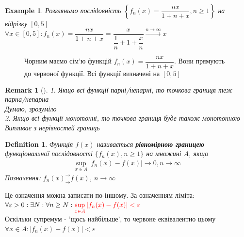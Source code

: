 \documentclass[a4paper, 14pt]{extarticle}
\def\huge{\displaystyle}
\theoremstyle{theoremdd}
\theoremstyle{theoremdd}
\newtheorem{definition}[theorem]{Definition}
\theoremstyle{theoremdd}
\theoremstyle{theoremdd}
\newtheorem{example}[theorem]{Example}
\theoremstyle{theoremdd}
\theoremstyle{theoremdd}
\newtheorem{remark}[theorem]{Remark}
\theoremstyle{theoremdd}
\theoremstyle{theoremdd}
\begin{document}
\begin{example}
Розгляньмо послідовність $\left\{f_n(x) = \dfrac{nx}{1+n+x}, n \geq 1 \right\}$ на відрізку $[0,5]$\\
$\forall x \in [0,5]: f_n(x) = \dfrac{nx}{1+n+x} = \dfrac{x}{\dfrac{1}{n} + 1 + \dfrac{x}{n}} \overset{n \to \infty}{\longrightarrow} x$
\end{example}
\begin{figure} [H]
\centering
{
\caption*{Чорним маємо сім'ю функцій $f_n(x) = \dfrac{nx}{1+n+x}$. Вони прямують до червоної функції. Всі функції визначені на $[0,5]$}
}
\end{figure}

\begin{remark}[\hspace{0.1cm}]
1. Якщо всі функції парні/непарні, то точкова границя теж парна/непарна\\
\textit{Думаю, зрозуміло}\\
2.
Якщо всі функції монотонні, то точкова границя буде також монотонною\\
\textit{Випливає з нерівностей границь}
\end{remark}

\begin{definition}
Функція $f(x)$ називається \textbf{рівномірною границею} функціональної послідовності $\{f_n(x), n \geq 1 \}$ на множині $A$, якщо
\begin{align*}
\sup_{x \in A} |f_n(x) - f(x)| \to 0, n \to \infty
\end{align*}
Позначення: $f_n(x)^\rightarrow_\rightarrow f(x)$, $n \to \infty$
\end{definition}
Це означення можна записати по-іншому. За означенням ліміта:\\
$\forall \varepsilon > 0: \exists N: \forall n \geq N: \textcolor{red}{\huge\sup_{x \in A} |f_n(x) - f(x)| < \varepsilon}$\\
Оскільки супремум - 'щось найбільше', то червоне еквівалентно цьому\\
$\forall x \in A: |f_n(x) - f(x)| < \varepsilon$\\
\end{document}
